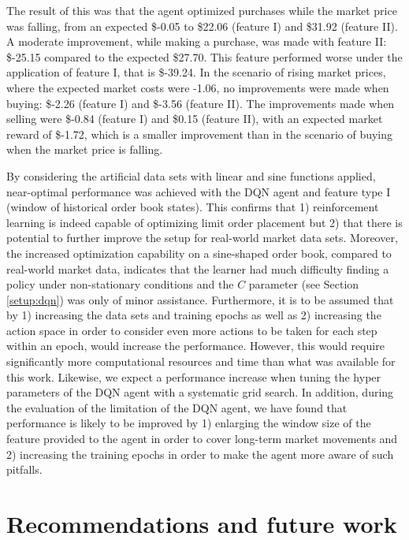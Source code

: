    The result of this was that the agent optimized purchases while the market price was falling, from an expected \$-0.05 to \$22.06 (feature I) and \$31.92 (feature II).
    A moderate improvement, while making a purchase, was made with feature II: \$-25.15 compared to the expected \$27.70. This feature performed worse under the application of feature I, that is \$-39.24.
    In the scenario of rising market prices, where the expected market costs were -1.06, no improvements were made when buying: \$-2.26 (feature I) and \$-3.56 (feature II).
    The improvements made when selling were \$-0.84 (feature I) and \$0.15 (feature II), with an expected market reward of \$-1.72, which is a smaller improvement than in the scenario of buying when the market price is falling.
    
    By considering the artificial data sets with linear and sine functions applied, near-optimal performance was achieved with the DQN agent and feature type I (window of historical order book states).
    This confirms that 1) reinforcement learning is indeed capable of optimizing limit order placement but 2) that there is potential to further improve the setup for real-world market data sets.
    Moreover, the increased optimization capability on a sine-shaped order book, compared to real-world market data, indicates that the learner had much difficulty finding a policy under non-stationary conditions and the $C$ parameter (see Section \ref{setup:dqn}) was only of minor assistance.
    Furthermore, it is to be assumed that by 1) increasing the data sets and training epochs as well as 2) increasing the action space in order to consider even more actions to be taken for each step within an epoch, would increase the performance.
    However, this would require significantly more computational resources and time than what was available for this work.
    Likewise, we expect a performance increase when tuning the hyper parameters of the DQN agent with a systematic grid search.
    In addition, during the evaluation of the limitation of the DQN agent, we have found that performance is likely to be improved by 1) enlarging the window size of the feature provided to the agent in order to cover long-term market movements and 2) increasing the training epochs in order to make the agent more aware of such pitfalls.

\section{Recommendations and future work}

